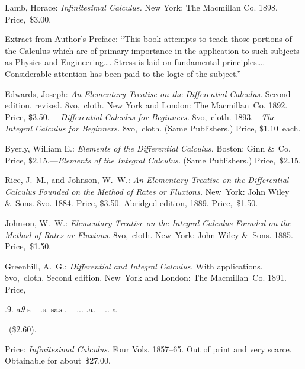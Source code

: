 \documentclass[12pt]{book}[2005/09/16]
\makeatletter
\newcommand{\Chg}[2]{#2}
\newlength{\ParIndent}
\newenvironment{Book}{\medskip\par\noindent\hangindent\ParIndent\ignorespaces}{\par}
\newenvironment{Descrip}{%
  \begin{list}{}{%
      \setlength{\leftmargin}{1.5\ParIndent}%
      \setlength{\itemindent}{\ParIndent}%
      \setlength{\listparindent}{\ParIndent}%
      \setlength{\topsep}{4pt}%
      \item\small\ignorespaces%
  }%
}{%
\end{list}}
\newcommand{\Pagelabel}[1]{\phantomsection\label{page:#1}}
\newcommand{\PageSep}[1]{\Pagelabel{#1}\ignorespaces}
\renewcommand{\(}{{\upshape(}}
\renewcommand{\)}{{\upshape)}}
\newcommand{\Title}[1]{\textit{#1}}
\newif\ifins@rtsp@ce
\def\Price#1{{\ins@rtsp@cefalse\Pr@ce #1\null}}
\def\Pr@ce#1{%
  \ifx#1\null\let\next\empty
  \else\let\next\Pr@ce
  \ifins@rtsp@ce~\ins@rtsp@cefalse\fi
  \if.#1.\ins@rtsp@cetrue
  \else\ifcat#1a\textit{#1}%
  \else{#1}%
  \fi\fi\fi\next}
\makeatother
\begin{document}
\begin{Book}
Lamb, Horace: \Title{Infinitesimal Calculus.} New York: The Macmillan
Co. 1898. Price,~\$3.00.

\begin{Descrip}
Extract from Author's Preface: ``This book attempts to teach
those portions of the Calculus which are of primary importance in
the application to such subjects as Physics and Engineering\dots.
Stress is laid on fundamental principles\dots. Considerable attention
has been paid to the logic of the subject.''
\end{Descrip}
\end{Book}
\PageSep{136}

\begin{Book}
Edwards, Joseph: \Title{An Elementary Treatise on the Differential
Calculus.} Second edition, revised. 8vo,~cloth. New York
and London: The Macmillan~Co. 1892. Price, \$3.50.---%
\Title{Differential Calculus for Beginners.} 8vo,~cloth. 1893.\Chg{ }{---}\Title{The
Integral Calculus for Beginners.} 8vo,~cloth. (Same Publishers.)
Price, \$1.10~each.
\end{Book}

\begin{Book}
Byerly, William E.: \Title{Elements of the Differential Calculus.} Boston:
Ginn \&~Co. Price, \$2.15.---\Title{Elements of the Integral
Calculus.} (Same Publishers.) Price,~\$2.15.
\end{Book}

\begin{Book}
Rice, J.~M., and Johnson, W.~W.: \Title{An Elementary Treatise on
the Differential Calculus Founded on the Method of Rates
or Fluxions.} New~York: John Wiley \&~Sons. 8vo. 1884.
Price, \$3.50. Abridged edition, 1889. Price,~\$1.50.
\end{Book}

\begin{Book}
Johnson, W.~W.: \Title{Elementary Treatise on the Integral Calculus
Founded on the Method of Rates or Fluxions.} 8vo,~cloth.
New~York: John Wiley \&~Sons. 1885. Price,~\$1.50.
\end{Book}

\begin{Book}
Greenhill, A.~G.: \Title{Differential and Integral Calculus.} With applications.
8vo,~cloth. Second edition. New~York and London:
The Macmillan~Co. 1891. Price, \Price{9s.}~(\$2.60).
\end{Book}

\begin{Book}
Price: \Title{Infinitesimal Calculus.} Four Vols. 1857--65. Out of
print and very scarce. Obtainable for about~\$27.00.
\end{Book}
\end{document}
